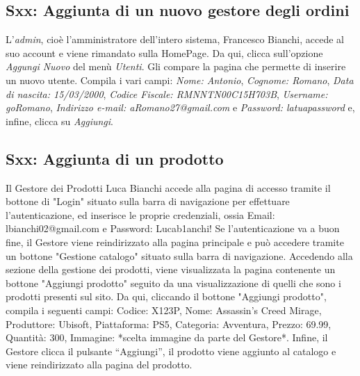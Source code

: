 \documentclass[12pt, a4paper, oneside]{book}
\begin{document}
    \subsection*{Sxx: Aggiunta di un nuovo gestore degli ordini}
    L'\textit{admin}, cioè l'amministratore dell'intero sistema, Francesco Bianchi, accede al suo account e viene rimandato sulla HomePage. Da qui, clicca sull'opzione \textit{Aggungi Nuovo} del menù \textit{Utenti}. Gli compare la pagina che permette di inserire un nuovo utente. Compila i vari campi: \textit{Nome: Antonio}, \textit{Cognome: Romano}, \textit{Data di nascita: 15/03/2000}, \textit{Codice Fiscale: RMNNTN00C15H703B}, \textit{Username: goRomano}, \textit{Indirizzo e-mail: aRomano27@gmail.com} e \textit{Password: latuapassword} e, infine, clicca su \textit{Aggiungi}.

    \subsection*{Sxx: Aggiunta di un prodotto}
    Il Gestore dei Prodotti Luca Bianchi accede alla pagina di accesso tramite il bottone di "Login" situato sulla barra di navigazione per effettuare l'autenticazione, ed inserisce le proprie credenziali, ossia Email: lbianchi02@gmail.com e Password: Lucab1anchi!
    Se l'autenticazione va a buon fine, il Gestore viene reindirizzato alla pagina principale e può accedere tramite un bottone "Gestione catalogo" situato sulla barra di navigazione.
    Accedendo alla sezione della gestione dei prodotti, viene visualizzata la pagina contenente un bottone "Aggiungi prodotto" seguito da una visualizzazione di quelli che sono i prodotti presenti sul sito.
    Da qui, cliccando il bottone "Aggiungi prodotto", compila i seguenti campi: Codice: X123P, Nome: Assassin's Creed Mirage, Produttore: Ubisoft, Piattaforma: PS5, Categoria: Avventura, Prezzo: 69.99, Quantità: 300, Immagine: *scelta immagine da parte del Gestore*.
    Infine, il Gestore clicca il pulsante “Aggiungi”, il prodotto viene aggiunto al catalogo e viene reindirizzato alla pagina del prodotto.
\end{document}

